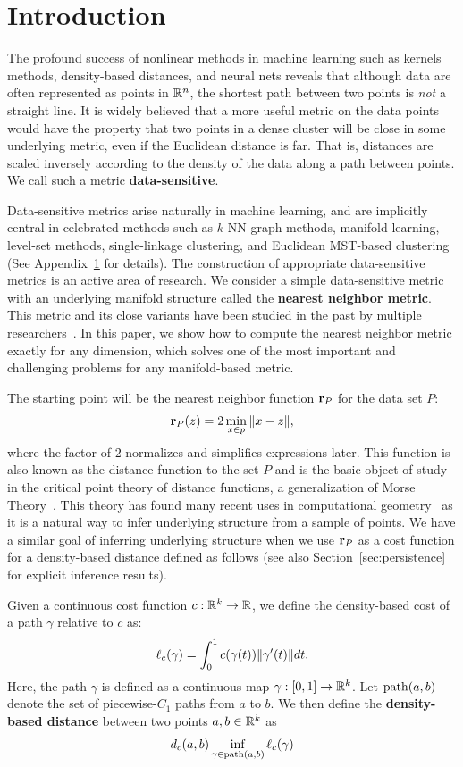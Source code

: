 \section{Introduction}

The profound success of nonlinear methods in machine learning such as kernels methods, density-based distances, and neural nets reveals that although data are often represented as points in $\mathbb{R}^n$, the shortest path between two points is \emph{not} a straight line.
It is widely believed that a more useful metric on the data points would have the property that two points in a dense cluster will be close in some underlying metric, even if the Euclidean distance is far.
That is, distances are scaled inversely according to the density of the data along a path between points.
We call such a metric \textbf{data-sensitive}.

Data-sensitive metrics arise naturally in machine learning, and are implicitly central in celebrated methods such as $k$-NN graph methods, manifold learning, level-set methods, single-linkage clustering, and Euclidean MST-based clustering (See Appendix~\ref{} for details).
The construction of appropriate data-sensitive metrics is an active area of research.
We consider a simple data-sensitive metric with an underlying manifold structure called the \textbf{nearest neighbor metric}.
This metric and its close variants have been studied in the past by multiple researchers~\cite{}.
In this paper, we show how to compute the nearest neighbor metric exactly for any dimension, which solves one of the most important and challenging problems for any manifold-based metric.

The starting point will be the nearest neighbor function $\mathbf{r}_P$ for the data set $P$:
\[
\mathbf{r}_P(z) = 2\min_{x\in p} \|x-z\|,
\]
where the factor of $2$ normalizes and simplifies expressions later.
This function is also known as the distance function to the set $P$ and is the basic object of study in the critical point theory of distance functions, a generalization of Morse Theory~\cite{grove93critical}.
This theory has found many recent uses in computational geometry~\cite{chazal08smooth,chazal09sampling} as it is a natural way to infer underlying structure from a sample of points.
We have a similar goal of inferring underlying structure when we use $\mathbf{r}_P$ as a cost function for a density-based distance defined as follows (see also Section~\ref{sec:persistence} for explicit inference results).

\begin{definition}
Given a continuous cost function $c:\mathbb{R}^k \rightarrow \mathbb{R}$, we define the density-based
cost of a path $\gamma$ relative to $c$ as:
\[ \ell_c(\gamma) = \int_{0}^1 c(\gamma(t)) \| \gamma'(t) \|dt. \]
Here, the path $\gamma$ is defined as a continuous map $\gamma:[0,1]
\to \mathbb{R}^k$.
Let $\mathrm{path}(a,b)$ denote the set of piecewise-$C_1$ paths from $a$ to $b$.
We then define the \textbf{density-based distance} between two points $a, b \in
\mathbb{R}^k$ as
\[ d_c(a,b) \inf_{\gamma\in\mathrm{path}(a,b)} \ell_c(\gamma)\]
\end{definition}

